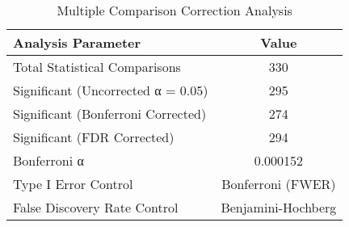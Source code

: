 \begin{table}[htbp]
\centering
\caption{Multiple Comparison Correction Analysis}
\label{tab:multiple-corrections}
\begin{tabular}{lc}
\toprule
Analysis Parameter & Value \\
\midrule
Total Statistical Comparisons & 330 \\
Significant (Uncorrected α = 0.05) & 295 \\
Significant (Bonferroni Corrected) & 274 \\
Significant (FDR Corrected) & 294 \\
Bonferroni α & 0.000152 \\
Type I Error Control & Bonferroni (FWER) \\
False Discovery Rate Control & Benjamini-Hochberg \\
\bottomrule
\end{tabular}
\end{table}
